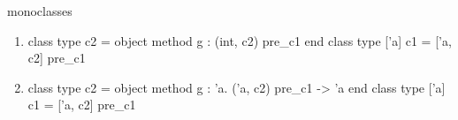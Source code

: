 \begin{exercise}{monoclasses}
\begin{answer}
\begin{enumerate}
\item

\begin{ocamllisting}
class type c2 = object method g : (int, c2) pre_c1 end
class type ['a] c1 = ['a, c2] pre_c1
\end{ocamllisting}

\item

\begin{ocamllisting}
class type c2 = object method g : 'a. ('a, c2) pre_c1 -> 'a end
class type ['a] c1 = ['a, c2] pre_c1
\end{ocamllisting}
\end{enumerate}
\fi\end{answer}
\end{exercise}


